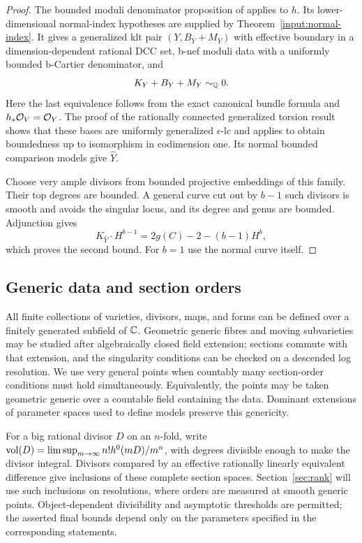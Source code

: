\begin{proof}
The bounded moduli denominator proposition of \citet[Proposition~4.1]{UPI}
applies to $h$. Its lower-dimensional normal-index hypotheses are
supplied by Theorem~\ref{input:normal-index}. It gives a generalized
klt pair $(Y,B_Y+M_Y)$ with effective boundary in a dimension-dependent
rational DCC set, b-nef moduli data with a uniformly bounded
b-Cartier denominator, and
\[
                         K_Y+B_Y+M_Y\sim_{\mathbb Q}0.
\]
Here the last equivalence follows from the exact canonical bundle
formula and $h_*\mathcal O_V=\mathcal O_Y$.
The proof of the rationally connected generalized torsion result
\citep[Proposition~4.5]{UPI} shows that these bases are uniformly
generalized $\epsilon$-lc and applies \citet[Theorem~1.7]{Birkar2025}
to obtain boundedness up to isomorphism in codimension one. Its normal
bounded comparison models give $\widehat Y$.

Choose very ample divisors from bounded projective embeddings of this
family. Their top degrees are bounded. A general curve cut out by
$b-1$ such divisors is smooth and avoids the singular locus, and its
degree and genus are bounded. Adjunction gives
\[
            K_{\widehat Y}\cdot H^{b-1}
                  =2g(C)-2-(b-1)H^b,
\]
which proves the second bound. For $b=1$ use the normal curve itself.
\end{proof}

\subsection{Generic data and section orders}

All finite collections of varieties, divisors, maps, and forms can be
defined over a finitely generated subfield of $\mathbb C$. Geometric generic
fibres and moving subvarieties may be studied after algebraically closed
field extension; sections commute with that extension, and the
singularity conditions can be checked on a descended log resolution.
We use very general points when countably many section-order conditions
must hold simultaneously. Equivalently, the points may be taken geometric
generic over a countable field containing the data. Dominant extensions
of parameter spaces used to define models preserve this genericity.

For a big rational divisor $D$ on an $n$-fold, write
$\operatorname{vol}(D)=\limsup_{m\to\infty}n!h^0(mD)/m^n$, with degrees divisible
enough to make the divisor integral. Divisors compared by an effective
rationally linearly equivalent difference give inclusions of these
complete section spaces. Section~\ref{sec:rank} will use such inclusions
on resolutions, where orders are measured at smooth generic points.
Object-dependent divisibility and asymptotic thresholds are permitted;
the asserted final bounds depend only on the parameters specified in
the corresponding statements.
